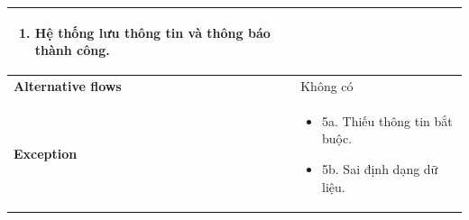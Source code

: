 \begin{enumerate}[label=\textbf{\alph*)}]
\begin{itemize}
\begin{center}
\begin{longtable}{|m{}|m{}|}
\begin{enumerate}[label=\arabic*.]
          \item Hệ thống lưu thông tin và thông báo thành công.
        \end{enumerate}\\
        \hline
        \textbf{Alternative flows} &
        Không có\\
        \hline
        \textbf{Exception} &
        \begin{itemize}
          \item 5a. Thiếu thông tin bắt buộc.
          \item 5b. Sai định dạng dữ liệu.
        \end{itemize}\\
        \hline
        \end{longtable}
    \end{center}


\end{itemize}
\end{enumerate}
